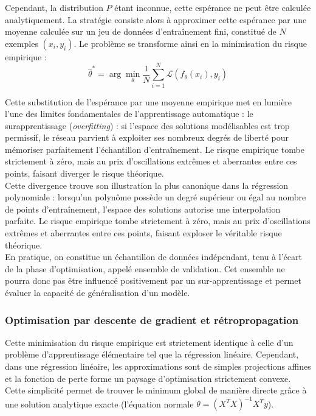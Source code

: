 Cependant, la distribution $P$ étant inconnue, cette espérance ne peut être calculée analytiquement. La stratégie consiste alors à approximer cette espérance par une moyenne calculée sur un jeu de données d'entraînement fini, constitué de $N$ exemples $(x_i, y_i)$. Le problème se transforme ainsi en la minimisation du risque empirique :
$$\hat{\theta}^* = \arg\min_\theta \frac{1}{N} \sum_{i=1}^N \mathcal{L}(f_\theta(x_i), y_i)$$

Cette substitution de l'espérance par une moyenne empirique met en lumière l'une des limites fondamentales de l'apprentissage automatique : le surapprentissage (\textit{overfitting}) : si l'espace des solutions modélisables est trop permissif, le réseau parvient à exploiter ses nombreux degrés de liberté pour mémoriser parfaitement l'échantillon d'entraînement. Le risque empirique tombe strictement à zéro, mais au prix d'oscillations extrêmes et aberrantes entre ces points, faisant diverger le risque théorique.\\

Cette divergence trouve son illustration la plus canonique dans la régression polynomiale : lorsqu'un polynôme possède un degré supérieur ou égal au nombre de points d'entraînement, l'espace des solutions autorise une interpolation parfaite. Le risque empirique tombe strictement à zéro, mais au prix d'oscillations extrêmes et aberrantes entre ces points, faisant exploser le véritable risque théorique.\\

En pratique, on constitue un échantillon de données indépendant, tenu à l'écart de la phase d'optimisation, appelé ensemble de validation. Cet ensemble ne pourra donc pas être influencé positivement par un sur-apprentissage et permet évaluer la capacité de généralisation d'un modèle.

\subsubsection{Optimisation par descente de gradient et rétropropagation}
Cette minimisation du risque empirique est strictement identique à celle d'un problème d'apprentissage élémentaire tel que la régression linéaire. Cependant, dans une régression linéaire, les approximations sont de simples projections affines et la fonction de perte forme un paysage d'optimisation strictement convexe. Cette simplicité permet de trouver le minimum global de manière directe grâce à une solution analytique exacte (l'équation normale $\theta = (X^T X)^{-1} X^T y$).\\


